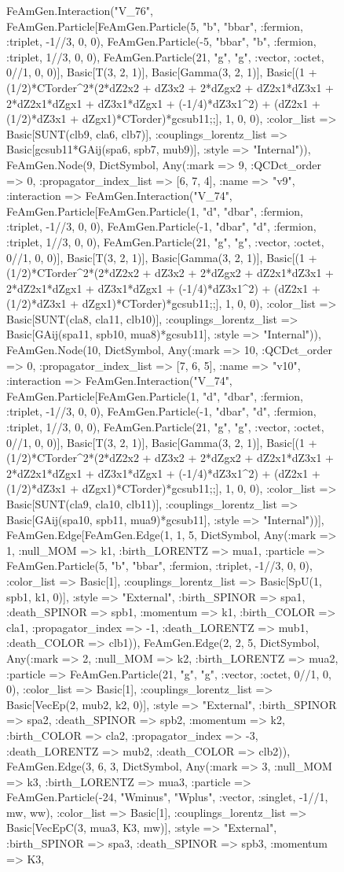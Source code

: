 \documentclass{revtex4}
\begin{document}
\begin{figure}[!htb]
\begin{center}
{FeAmGen.Interaction("V_76", FeAmGen.Particle[FeAmGen.Particle(5, "b", "bbar", :fermion, :triplet, -1//3, 0, 0), FeAmGen.Particle(-5, "bbar", "b", :fermion, :triplet, 1//3, 0, 0), FeAmGen.Particle(21, "g", "g", :vector, :octet, 0//1, 0, 0)], Basic[T(3, 2, 1)], Basic[Gamma(3, 2, 1)], Basic[(1 + (1/2)*CTorder^2*(2*dZ2x2 + dZ3x2 + 2*dZgx2 + dZ2x1*dZ3x1 + 2*dZ2x1*dZgx1 + dZ3x1*dZgx1 + (-1/4)*dZ3x1^2) + (dZ2x1 + (1/2)*dZ3x1 + dZgx1)*CTorder)*gcsub11;;], 1, 0, 0), :color_list => Basic[SUNT(clb9, cla6, clb7)], :couplings_lorentz_list => Basic[gcsub11*GAij(spa6, spb7, mub9)], :style => "Internal")), FeAmGen.Node(9, Dict{Symbol, Any}(:mark => 9, :QCDct_order => 0, :propagator_index_list => [6, 7, 4], :name => "v9", :interaction => FeAmGen.Interaction("V_74", FeAmGen.Particle[FeAmGen.Particle(1, "d", "dbar", :fermion, :triplet, -1//3, 0, 0), FeAmGen.Particle(-1, "dbar", "d", :fermion, :triplet, 1//3, 0, 0), FeAmGen.Particle(21, "g", "g", :vector, :octet, 0//1, 0, 0)], Basic[T(3, 2, 1)], Basic[Gamma(3, 2, 1)], Basic[(1 + (1/2)*CTorder^2*(2*dZ2x2 + dZ3x2 + 2*dZgx2 + dZ2x1*dZ3x1 + 2*dZ2x1*dZgx1 + dZ3x1*dZgx1 + (-1/4)*dZ3x1^2) + (dZ2x1 + (1/2)*dZ3x1 + dZgx1)*CTorder)*gcsub11;;], 1, 0, 0), :color_list => Basic[SUNT(cla8, cla11, clb10)], :couplings_lorentz_list => Basic[GAij(spa11, spb10, mua8)*gcsub11], :style => "Internal")), FeAmGen.Node(10, Dict{Symbol, Any}(:mark => 10, :QCDct_order => 0, :propagator_index_list => [7, 6, 5], :name => "v10", :interaction => FeAmGen.Interaction("V_74", FeAmGen.Particle[FeAmGen.Particle(1, "d", "dbar", :fermion, :triplet, -1//3, 0, 0), FeAmGen.Particle(-1, "dbar", "d", :fermion, :triplet, 1//3, 0, 0), FeAmGen.Particle(21, "g", "g", :vector, :octet, 0//1, 0, 0)], Basic[T(3, 2, 1)], Basic[Gamma(3, 2, 1)], Basic[(1 + (1/2)*CTorder^2*(2*dZ2x2 + dZ3x2 + 2*dZgx2 + dZ2x1*dZ3x1 + 2*dZ2x1*dZgx1 + dZ3x1*dZgx1 + (-1/4)*dZ3x1^2) + (dZ2x1 + (1/2)*dZ3x1 + dZgx1)*CTorder)*gcsub11;;], 1, 0, 0), :color_list => Basic[SUNT(cla9, cla10, clb11)], :couplings_lorentz_list => Basic[GAij(spa10, spb11, mua9)*gcsub11], :style => "Internal"))], FeAmGen.Edge[FeAmGen.Edge(1, 1, 5, Dict{Symbol, Any}(:mark => 1, :null_MOM => k1, :birth_LORENTZ => mua1, :particle => FeAmGen.Particle(5, "b", "bbar", :fermion, :triplet, -1//3, 0, 0), :color_list => Basic[1], :couplings_lorentz_list => Basic[SpU(1, spb1, k1, 0)], :style => "External", :birth_SPINOR => spa1, :death_SPINOR => spb1, :momentum => k1, :birth_COLOR => cla1, :propagator_index => -1, :death_LORENTZ => mub1, :death_COLOR => clb1)), FeAmGen.Edge(2, 2, 5, Dict{Symbol, Any}(:mark => 2, :null_MOM => k2, :birth_LORENTZ => mua2, :particle => FeAmGen.Particle(21, "g", "g", :vector, :octet, 0//1, 0, 0), :color_list => Basic[1], :couplings_lorentz_list => Basic[VecEp(2, mub2, k2, 0)], :style => "External", :birth_SPINOR => spa2, :death_SPINOR => spb2, :momentum => k2, :birth_COLOR => cla2, :propagator_index => -3, :death_LORENTZ => mub2, :death_COLOR => clb2)), FeAmGen.Edge(3, 6, 3, Dict{Symbol, Any}(:mark => 3, :null_MOM => k3, :birth_LORENTZ => mua3, :particle => FeAmGen.Particle(-24, "Wminus", "Wplus", :vector, :singlet, -1//1, mw, ww), :color_list => Basic[1], :couplings_lorentz_list => Basic[VecEpC(3, mua3, K3, mw)], :style => "External", :birth_SPINOR => spa3, :death_SPINOR => spb3, :momentum => K3, }
\end{center}
\end{figure}
\end{document}
